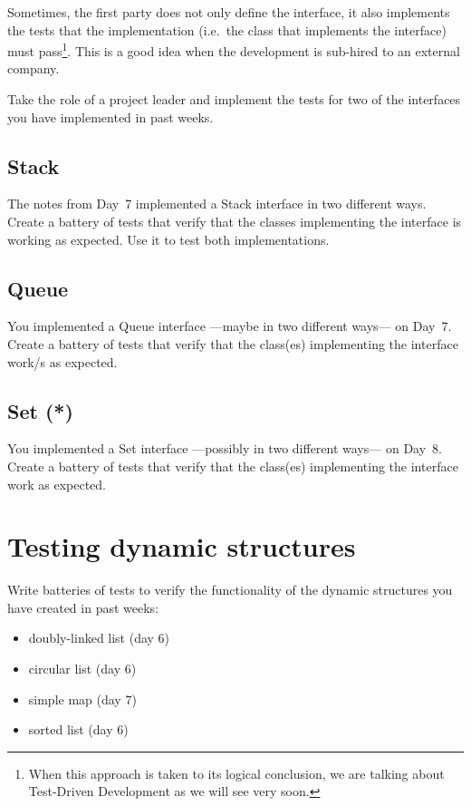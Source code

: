 \documentclass{article}
\begin{document}
Sometimes, the first party does not only define the interface, it also
implements the tests that the implementation (i.e.~the class that
implements the interface) must pass\footnote{When this approach is taken to
its logical conclusion, we are talking about Test-Driven Development
as we will see very soon.}. This is a good idea when the development is
sub-hired to an external company. 

Take the role of a project leader and implement the tests for two of
the interfaces you have implemented in past weeks. 

\subsection{Stack}
\label{sec:stack3}

The notes from Day~7 implemented a Stack interface in two different
ways. Create a battery of tests that verify that the classes
implementing the interface is working as expected. Use it to test both
implementations.

\subsection{Queue}
\label{sec:stack2}

You implemented a Queue interface ---maybe in two different ways--- on
Day~7. Create a battery of tests that verify that the class(es)
implementing the interface work/s as expected. 

\subsection{Set (*)}
\label{sec:stack5}

You implemented a Set interface ---possibly in two different ways--- on
Day~8. Create a battery of tests that verify that the class(es)
implementing the interface work as expected. 


\section{Testing dynamic structures}
\label{sec:testing-maps}

Write batteries of tests to verify the functionality of the dynamic
structures you have created in past weeks: 

\begin{itemize}
\item doubly-linked list (day 6)
\item circular list (day 6)
\item simple map (day 7)
\item sorted list (day 6)
\end{itemize}
\end{document}
